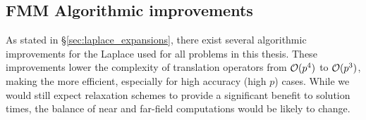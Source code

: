 \subsection{FMM Algorithmic improvements}

As stated in \S\ref{sec:laplace_expansions}, there exist several algorithmic improvements for the Laplace {\fmm} used for all problems in this thesis. These improvements lower the complexity of translation operators from $\mathcal{O}(p^{4})$ to $\mathcal{O}(p^{3})$, making the {\fmm} more efficient, especially for high accuracy (high $p$) cases. While we would still expect relaxation schemes to provide a significant benefit to solution times, the balance of near and far-field computations would be likely to change.